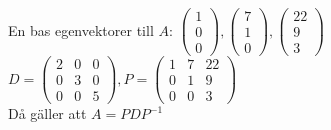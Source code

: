 En bas egenvektorer till $A$: $\begin{pmatrix}
    1\\0\\0
\end{pmatrix},\begin{pmatrix}
    7\\1\\0
\end{pmatrix},\begin{pmatrix}
    22\\
    9\\
    3
\end{pmatrix}$\\
$D=\begin{pmatrix}
    2&0&0\\
    0&3&0\\
    0&0&5
\end{pmatrix},
P=\begin{pmatrix}
    1&7&22\\
    0&1&9\\
    0&0&3
\end{pmatrix}$\\
Då gäller att $A=PDP^{-1}$
